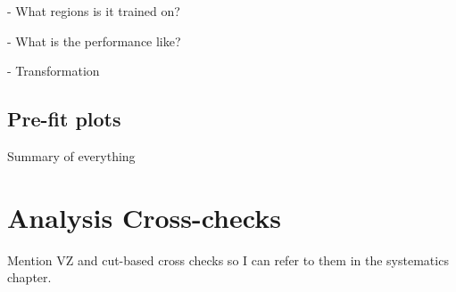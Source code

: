 - What regions is it trained on?

- What is the performance like?

- Transformation

\subsection{Pre-fit plots}
Summary of everything






\section{Analysis Cross-checks}
Mention VZ and cut-based cross checks so I can refer to them in the systematics
chapter.






